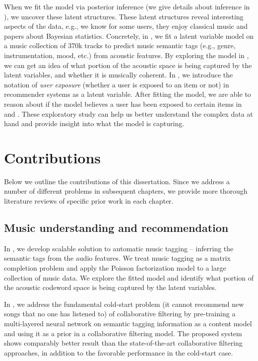 When we fit the model via posterior inference (we give details about inference in ), we uncover these latent structures. These latent structures reveal interesting aspects of the data, e.g., we know for some users, they enjoy classical music and papers about Bayesian statistics. Concretely, in , we fit a latent variable model on a music collection of 370k tracks to predict music semantic tags (e.g., genre, instrumentation, mood, etc.) from acoustic features. By exploring the model in , we can get an idea of what portion of the acoustic space is being captured by the latent variables, and whether it is musically coherent. In , we introduce the notation of \textit{user exposure} (whether a user is exposed to an item or not) in recommender systems as a latent variable. After fitting the model, we are able to reason about if the model believes a user has been exposed to certain items in  and . These exploratory study can help us better understand the complex data at hand and provide insight into what the model is capturing. 

\section{Contributions}\label{chpt:intro:sec:contribution}
Below we outline the contributions of this dissertation. Since we address a number of different problems in subsequent chapters, we provide more thorough literature reviews of specific prior work in each chapter.

\subsection{Music understanding and recommendation}
In , we develop scalable solution to automatic music tagging -- inferring the semantic tags from the audio features. We treat music tagging as a matrix completion problem and apply the Poisson factorization model to a large collection of music data. We explore the fitted model and identify what portion of the acoustic codeword space is being captured by the latent variables.

In , we address the fundamental cold-start problem (it cannot recommend new songs that no one has listened to) of collaborative filtering by pre-training a multi-layered neural network on semantic tagging information as a content model and using it as a prior in a collaborative filtering model.  The proposed system shows comparably better result than the state-of-the-art collaborative filtering approaches, in addition to the favorable performance in the cold-start case. 

